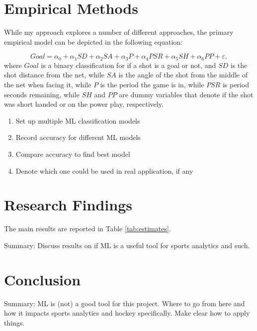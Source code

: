 \documentclass[12pt,english]{article}
\begin{document}
\section{Empirical Methods}\label{sec:methods}
While my approach explores a number of different approaches, the primary empirical model can be depicted in the following equation:

\begin{equation}
\label{eq:1}
Goal=\alpha_{0} + \alpha_{1}SD + \alpha_{2} SA + \alpha_{3} P + \alpha_{4} PSR + \alpha_{5} SH + \alpha_{6} PP + \varepsilon,
\end{equation}
where $Goal$ is a binary classification for if a shot is a goal or not, and $SD$ is the shot distance from the net, while $SA$ is the angle of the shot from the middle of the net when facing it, while $P$ is the period the game is in, while $PSR$ is period seconds remaining, while $SH$ and $PP$ are dummy variables that denote if the shot was short handed or on the power play, respectively. 

\begin{enumerate}
    \item Set up multiple ML classification models
    \item Record accuracy for different ML models
    \item Compare accuracy to find best model
    \item Denote which one could be used in real application, if any
\end{enumerate}

\section{Research Findings}\label{sec:results}
The main results are reported in Table \ref{tab:estimates}.

Summary: Discuss results on if ML is a useful tool for sports analytics and such. 

\section{Conclusion}\label{sec:conclusion}

Summary: ML is (not) a good tool for this project. Where to go from here and how it impacts sports analytics and hockey specifically. Make clear how to apply things.

\vfill
\pagebreak{}
\begin{spacing}{1.0}


\end{spacing}
\end{document}
